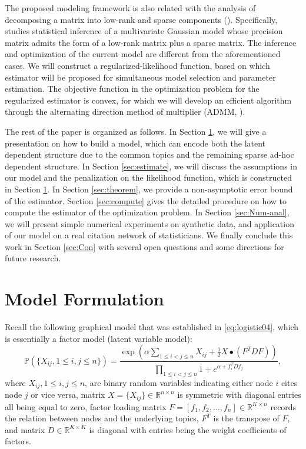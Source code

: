 \documentclass[AMS,STIX1COL]{WileyNJD-v2}
\begin{document}
{The proposed modeling framework is also related with the analysis of decomposing a matrix into low-rank and sparse components (\cite{agarwal2012noisy,candes2011robust,chandrasekaran2010latent, zhou2010stable}).
Specifically, \cite{chandrasekaran2010latent} studies statistical inference of a multivariate Gaussian model whose precision matrix admits the form of a low-rank matrix plus a sparse matrix.
The inference and optimization of the current model are different from the aforementioned cases.
We will construct a regularized-likelihood function, based on which estimator will be proposed for simultaneous model selection and parameter estimation.
The objective function in the optimization problem for the regularized estimator is convex, for which we will develop an efficient algorithm through the alternating direction method of multiplier (ADMM, \cite{boyd2011distributed, gabay1975dual, glowinski1975solution}).

The rest of the paper is organized as follows.
In Section \ref{sec:model-form}, we will give a presentation on how to build a model, which can encode both the latent dependent structure due to the common topics and the remaining sparse ad-hoc dependent structure.
In Section \ref{sec:estimate}, we will discuss the assumptions in our model and the penalization on the likelihood function, which is constructed in Section \ref{sec:model-form}.
In Section \ref{sec:theorem}, we provide a non-asymptotic error bound of the estimator.
Section \ref{sec:compute} gives the detailed procedure on how to compute the estimator of the optimization problem.
In Section \ref{sec:Num-anal}, we will present simple numerical experiments on synthetic data, and application of our model on a real citation network of statisticians.
We finally conclude this work in Section \ref{sec:Con} with several open questions and some directions for future research.

\section{Model Formulation}
\label{sec:model-form}

Recall the following graphical model that was established in \eqref{eq:logistic04}, which is essentially a factor model (latent variable model):
$$
\mathbb{P}\left(\{X_{ij}, 1\le i,j \le n\}\right)
= \frac{\exp\left(\alpha \sum_{1\le i< j\le n}X_{ij} +\frac{1}{2} X \bullet (F^T D F)\right)}{\prod_{1\le i<j \le n}  1 + e^{\alpha + f_i^T D f_j }},
$$
where
$X_{ij}, 1\le i,j \le n$, are binary random variables indicating either node $i$ cites node $j$ or vice versa,
matrix $X = \{X_{ij}\} \in \mathbb{R}^{n \times n}$ is symmetric with diagonal entries all being equal to zero,
factor loading matrix $F = [f_1,f_2,\ldots,f_n]\in \mathbb{R}^{K\times n}$ records the relation between nodes and the underlying topics, $F^T$ is the transpose of $F$,
and matrix $D \in \mathbb{R}^{K \times K}$  is diagonal with entries being the weight coefficients of factors.

}
\end{document}
